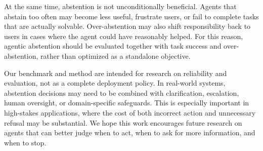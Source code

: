 \documentclass{article}
\begin{document}
At the same time, abstention is not unconditionally beneficial. Agents that abstain too often may become less useful, frustrate users, or fail to complete tasks that are actually solvable. Over-abstention may also shift responsibility back to users in cases where the agent could have reasonably helped. For this reason, agentic abstention should be evaluated together with task success and over-abstention, rather than optimized as a standalone objective.

Our benchmark and method are intended for research on reliability and evaluation, not as a complete deployment policy. In real-world systems, abstention decisions may need to be combined with clarification, escalation, human oversight, or domain-specific safeguards. This is especially important in high-stakes applications, where the cost of both incorrect action and unnecessary refusal may be substantial. We hope this work encourages future research on agents that can better judge when to act, when to ask for more information, and when to stop.










\end{document}
